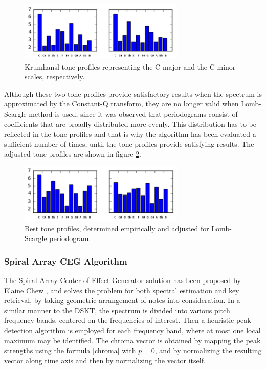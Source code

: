 \documentclass[letterpaper]{article}
\begin{document}
\begin{figure}
\begin{center}
\includegraphics[width=3.1in,angle=0]{imgs/Krumhansl.png}
\caption{Krumhansl tone profiles representing the C major and the C minor scales, respectively.}
\label{krumhansl}
\end{center}
\end{figure}

Although these two tone profiles provide satisfactory results when the spectrum is approximated by the Constant-Q transform, they are no longer valid 
when Lomb-Scargle method is used, since it was observed that periodograms consist of coefficients that are broadly distributed more evenly. This distribution has to be reflected in the tone profiles and that is why the algorithm has been evaluated a sufficient number of times, until the tone profiles
provide satisfying results. The adjusted tone profiles are shown in figure \ref{profiles}.

\begin{figure}
\begin{center}
\includegraphics[width=3.1in,angle=0]{imgs/Custom.png}
\caption{Best tone profiles, determined empirically and adjusted for Lomb-Scargle periodogram.}
\label{profiles}
\end{center}
\end{figure}

\subsubsection{Spiral Array CEG Algorithm}

The Spiral Array Center of Effect Generator solution has been proposed by Elaine Chew \citep{SPIRAL}, and solves the problem for both spectral estimation and key retrieval, by taking geometric arrangement of notes into consideration.
In a similar manner to the DSKT, the spectrum is divided into various pitch frequency bands, centered on the frequencies of interest. Then a heuristic peak detection algorithm is employed for each frequency band, where 
at most one local maximum may be identified. The chroma vector is obtained by mapping the peak strengths using the formula \ref{chroma} with $p = 0$, and by normalizing the resulting vector along time axis and then by normalizing the vector itself.\\
\end{document}
